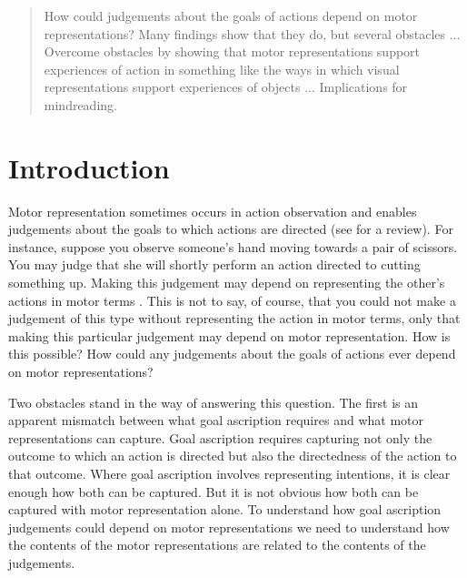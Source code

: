 \documentclass[12pt,\papersize]{extarticle}
\begin{document}
\setlength\footnotesep{1em}


\maketitle
\title{}





\begin{abstract}
\noindent
%
How could judgements about the goals of actions depend on motor representations? Many findings show that they do, but several obstacles ... Overcome obstacles by showing that motor representations support experiences of action in something like the ways in which visual representations support experiences of objects ... Implications for mindreading.
%
\end{abstract}










\section{Introduction}

Motor representation sometimes occurs in action observation and enables judgements about the goals to which actions are directed (see \citealp{rizzolatti_functional_2010} for a review). For instance, suppose you observe someone's hand moving towards a pair of scissors. You may judge that she will shortly perform an action directed to cutting something up. Making this judgement may depend on representing the other's actions in motor terms \citep{boria:2009_intention, ortigue:2010_understanding}.  This is not to say, of course, that you could not make a judgement of this type without representing the action in motor terms, only that making this particular judgement may depend on motor representation. How is this possible? How could any judgements about the goals of actions ever depend on motor representations?

Two obstacles stand in the way of answering this question. The first is an apparent mismatch between what goal ascription requires and what motor representations can capture. Goal ascription requires capturing not only the outcome to which an action is directed but also the directedness of the action to that outcome. Where goal ascription involves representing intentions, it is clear enough how both can be captured. But it is not obvious how both can be captured with motor representation alone. To understand how goal ascription judgements could depend on motor representations we need to understand how the contents of the motor representations are related to the contents of the judgements.
\end{document}
